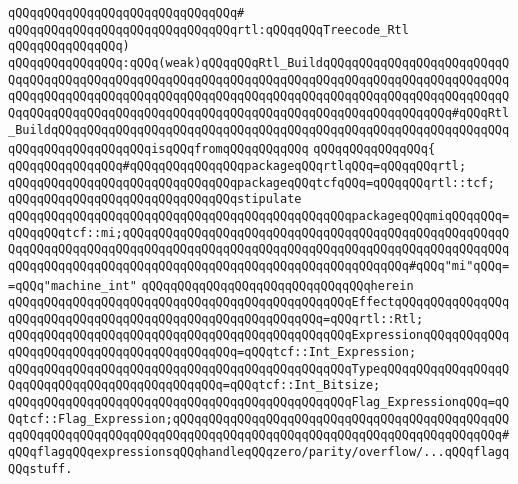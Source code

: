 \verb|qQQqqQQqqQQqqQQqqQQqqQQqqQQqqQQq#|\newline
\verb|qQQqqQQqqQQqqQQqqQQqqQQqqQQqqQQqrtl:qQQqqQQqTreecode_Rtl|\newline
\verb|qQQqqQQqqQQqqQQq)|\newline
\verb|qQQqqQQqqQQqqQQq:qQQq(weak)qQQqqQQqRtl_BuildqQQqqQQqqQQqqQQqqQQqqQQqqQQqqQQqqQQqqQQqqQQqqQQqqQQqqQQqqQQqqQQqqQQqqQQqqQQqqQQqqQQqqQQqqQQqqQQqqQQqqQQqqQQqqQQqqQQqqQQqqQQqqQQqqQQqqQQqqQQqqQQqqQQqqQQqqQQqqQQqqQQqqQQqqQQqqQQqqQQqqQQqqQQqqQQqqQQqqQQqqQQqqQQqqQQqqQQqqQQqqQQqqQQq#qQQqRtl_BuildqQQqqQQqqQQqqQQqqQQqqQQqqQQqqQQqqQQqqQQqqQQqqQQqqQQqqQQqqQQqqQQqqQQqqQQqqQQqqQQqqQQqisqQQqfromqQQqqQQqqQQq|\newline
\verb|qQQqqQQqqQQqqQQq{|\newline
\verb|qQQqqQQqqQQqqQQq#qQQqqQQqqQQqqQQqpackageqQQqrtlqQQq=qQQqqQQqrtl;|\newline
\newline
\verb|qQQqqQQqqQQqqQQqqQQqqQQqqQQqqQQqpackageqQQqtcfqQQq=qQQqqQQqrtl::tcf;|\newline
\newline
\verb|qQQqqQQqqQQqqQQqqQQqqQQqqQQqqQQqstipulate|\newline
\verb|qQQqqQQqqQQqqQQqqQQqqQQqqQQqqQQqqQQqqQQqqQQqqQQqpackageqQQqmiqQQqqQQq=qQQqqQQqtcf::mi;qQQqqQQqqQQqqQQqqQQqqQQqqQQqqQQqqQQqqQQqqQQqqQQqqQQqqQQqqQQqqQQqqQQqqQQqqQQqqQQqqQQqqQQqqQQqqQQqqQQqqQQqqQQqqQQqqQQqqQQqqQQqqQQqqQQqqQQqqQQqqQQqqQQqqQQqqQQqqQQqqQQqqQQqqQQqqQQqqQQq#qQQq"mi"qQQq==qQQq"machine_int"|\newline
\verb|qQQqqQQqqQQqqQQqqQQqqQQqqQQqqQQqherein|\newline
\newline
\verb|qQQqqQQqqQQqqQQqqQQqqQQqqQQqqQQqqQQqqQQqqQQqqQQqEffectqQQqqQQqqQQqqQQqqQQqqQQqqQQqqQQqqQQqqQQqqQQqqQQqqQQqqQQqqQQq=qQQqrtl::Rtl;|\newline
\verb|qQQqqQQqqQQqqQQqqQQqqQQqqQQqqQQqqQQqqQQqqQQqqQQqExpressionqQQqqQQqqQQqqQQqqQQqqQQqqQQqqQQqqQQqqQQqqQQq=qQQqtcf::Int_Expression;|\newline
\verb|qQQqqQQqqQQqqQQqqQQqqQQqqQQqqQQqqQQqqQQqqQQqqQQqTypeqQQqqQQqqQQqqQQqqQQqqQQqqQQqqQQqqQQqqQQqqQQqqQQq=qQQqtcf::Int_Bitsize;|\newline
\verb|qQQqqQQqqQQqqQQqqQQqqQQqqQQqqQQqqQQqqQQqqQQqqQQqFlag_ExpressionqQQq=qQQqtcf::Flag_Expression;qQQqqQQqqQQqqQQqqQQqqQQqqQQqqQQqqQQqqQQqqQQqqQQqqQQqqQQqqQQqqQQqqQQqqQQqqQQqqQQqqQQqqQQqqQQqqQQqqQQqqQQqqQQqqQQqqQQq#qQQqflagqQQqexpressionsqQQqhandleqQQqzero/parity/overflow/...qQQqflagqQQqstuff.|\newline
